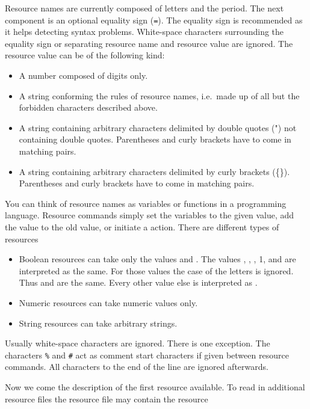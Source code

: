 \documentclass[11pt,a4paper]{scrbook}
\begin{document}
Resource names are currently composed of letters and the period. The next
component is an optional equality sign (\texttt{=}). The equality sign is
recommended as it helps detecting syntax problems. White-space characters
surrounding the equality sign or separating resource name and resource value
are ignored. The resource value can be of the following kind:
\begin{itemize}
\item A number composed of digits only.
\item A string conforming the rules of resource names, i.e.\ made up of all
  but the forbidden characters described above.
\item A string containing arbitrary characters delimited by double quotes (")
  not containing double quotes. Parentheses and curly brackets have to come in
  matching pairs.
\item A string containing arbitrary characters delimited by curly brackets
  (\{\}). Parentheses and curly brackets have to come in matching pairs.
\end{itemize}

You can think of resource names as variables or functions in a programming
language. Resource commands simply set the variables to the given value, add
the value to the old value, or initiate a action. There are different types of
resources
\begin{itemize}
\item Boolean resources can take only the values  and . The
  values , , , 1, and  are interpreted as
  the same. For those values the case of the letters is ignored. Thus
   and  are the same. Every other value else is
  interpreted as .
\item Numeric resources can take numeric values only.
\item String resources can take arbitrary strings.
\end{itemize}

Usually white-space characters are ignored. There is one exception. The
characters \texttt{\%} and \texttt{\#} act as comment start characters if
given between resource commands. All characters to the end of the line are
ignored afterwards.


Now we come the description of the first resource available. To read in
additional resource files the resource file may contain the resource

\begin{Resources}
\end{Resources}
\end{document}
